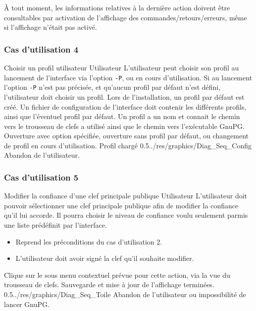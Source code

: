 \documentclass{../res/univ-projet}
\begin{document}
\`{A} tout moment, les informations relatives à la dernière action doivent être consultables par activation de l'affichage des commandes/retours/erreurs, même si l'affichage n'était pas activé.


\subsubsection{Cas d'utilisation 4}
\ficheGraphic
{Choisir un profil utilisateur}
{Utilisateur}
{L'utilisateur peut choisir son profil au lancement de l'interface via l'option \texttt{-P}, ou en cours d'utilisation. Si au lancement l'option \texttt{-P} n'est pas précisée, et qu'aucun profil par défaut n'est défini, l'utilisateur doit choisir un profil. Lors de l'installation, un profil par défaut est créé.}
{Un fichier de configuration de l'interface doit contenir les différents profils, ainsi que l'éventuel profil par défaut. 
Un profil a un nom et connait le chemin vers le trousseau de clefs a utilisé ainsi que le chemin vers l'exécutable GnuPG.}
{Ouverture avec option spécifiée, ouverture sans profil par défaut, ou changement de profil en cours d'utilisation.}
{Profil chargé}
{0.5}{../res/graphics/Diag_Seq_Config}
{Abandon de l'utilisateur.}
\vspace{0.5cm}


\subsubsection{Cas d'utilisation 5}
\ficheGraphic
{Modifier la confiance d'une clef principale publique}         
{Utilisateur}
{L'utilisateur doit pouvoir sélectionner une clef principale publique afin de modifier la confiance qu'il lui accorde. 
Il pourra choisir le niveau de confiance voulu seulement parmis une liste prédéfinit par l'interface.
}
{
\begin{itemize}
 \item Reprend les préconditions du cas d'utilisation 2.
 \item L'utilisateur doit avoir signé la clef qu'il souhaite modifier.
\end{itemize}

}
{Clique sur le sous menu contextuel prévue pour cette action, via la vue du trousseau de clefs.}
{Sauvegarde et mise à jour de l'affichage terminées.}
{0.5}{../res/graphics/Diag_Seq_Toile}
{Abandon de l'utilisateur ou impossibilité de lancer GnuPG.}                      
\vspace{0.5cm}
  
\end{document}
